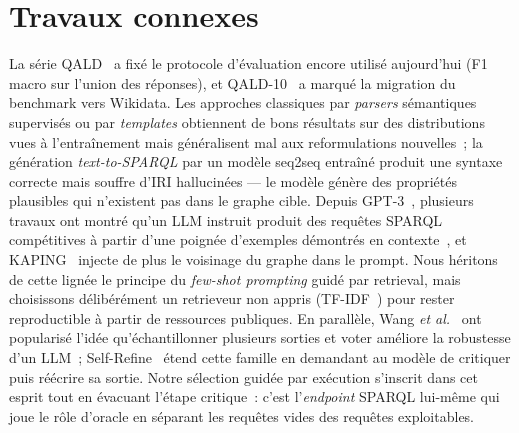 \documentclass[]{ceurart}
\begin{document}
\section{Travaux connexes}
\label{sec:related}
La série QALD~\cite{usbeck2017qald} a fixé le protocole d'évaluation encore utilisé aujourd'hui (F1 macro sur l'union des réponses), et QALD-10~\cite{perevalov2022qald10} a marqué la migration du benchmark vers Wikidata. Les approches classiques par \emph{parsers} sémantiques supervisés ou par \emph{templates} obtiennent de bons résultats sur des distributions vues à l'entraînement mais généralisent mal aux reformulations nouvelles~; la génération \emph{text-to-SPARQL} par un modèle seq2seq entraîné produit une syntaxe correcte mais souffre d'IRI hallucinées — le modèle génère des propriétés plausibles qui n'existent pas dans le graphe cible. Depuis GPT-3~\cite{brown2020gpt3}, plusieurs travaux ont montré qu'un LLM instruit produit des requêtes SPARQL compétitives à partir d'une poignée d'exemples démontrés en contexte~\cite{li2023fewshot}, et KAPING~\cite{baek2023kaping} injecte de plus le voisinage du graphe dans le prompt. Nous héritons de cette lignée le principe du \emph{few-shot prompting} guidé par retrieval, mais choisissons délibérément un retrieveur non appris (TF-IDF~\cite{salton1988term}) pour rester reproductible à partir de ressources publiques. En parallèle, Wang \emph{et al.}~\cite{wang2022selfconsistency} ont popularisé l'idée qu'échantillonner plusieurs sorties et voter améliore la robustesse d'un LLM~; Self-Refine~\cite{madaan2023selfrefine} étend cette famille en demandant au modèle de critiquer puis réécrire sa sortie. Notre sélection guidée par exécution s'inscrit dans cet esprit tout en évacuant l'étape critique~: c'est l'\emph{endpoint} SPARQL lui-même qui joue le rôle d'oracle en séparant les requêtes vides des requêtes exploitables.

\end{document}
